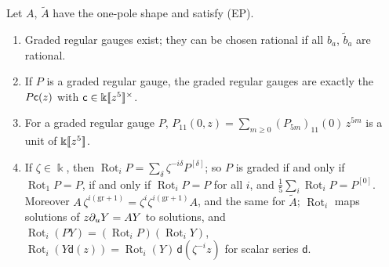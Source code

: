 \begin{prop}
\label{prop:gau-graded}
Let $A$, $\tilde A$ have the one-pole shape and satisfy (EP).
\begin{enumerate}
\item Graded regular gauges exist; they can be chosen rational if all $b_a$, $\tilde b_a$ are rational.
\item If $P$ is a graded regular gauge, the graded regular gauges are exactly the $P\mathsf{c}(z)$ with $\mathsf{c}\in\Bbbk[\![ z^5 ]\!]^\times$.
\item For a graded regular gauge $P$, $P_{11}(0,z)=\sum_{m\geq0}(P_{5m})_{11}(0)\,z^{5m}$ is a unit of $\Bbbk[\![ z^5 ]\!]$.
\item If $\zeta\in\Bbbk$, then $\operatorname{Rot}_iP=\sum_\delta\zeta^{-i\delta}P^{[\delta]}$; so $P$ is graded if and only if $\operatorname{Rot}_1P=P$, if and only if $\operatorname{Rot}_iP=P$ for all $i$, and $\frac15\sum_i\operatorname{Rot}_iP=P^{[0]}$. Moreover $A\,\zeta^{i(\mathrm{gr}+1)}=\zeta^i\zeta^{i(\mathrm{gr}+1)}A$, and the same for $\tilde A$; $\operatorname{Rot}_i$ maps solutions of $z\partial_uY=AY$ to solutions, and $\operatorname{Rot}_i(PY)=(\operatorname{Rot}_iP)(\operatorname{Rot}_iY)$, $\operatorname{Rot}_i(Y\mathsf d(z))=\operatorname{Rot}_i(Y)\,\mathsf d(\zeta^{-i}z)$ for scalar series $\mathsf d$.
\end{enumerate}
\end{prop}

